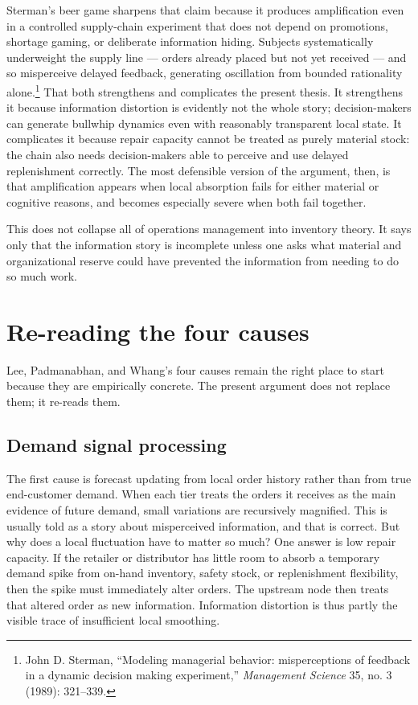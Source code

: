 \documentclass[11pt]{article}
\begin{document}
Sterman's beer game sharpens that claim because it produces amplification even in a controlled supply-chain experiment that does not depend on promotions, shortage gaming, or deliberate information hiding. Subjects systematically underweight the supply line --- orders already placed but not yet received --- and so misperceive delayed feedback, generating oscillation from bounded rationality alone.\footnote{John D. Sterman, ``Modeling managerial behavior: misperceptions of feedback in a dynamic decision making experiment,'' \emph{Management Science} 35, no. 3 (1989): 321--339.} That both strengthens and complicates the present thesis. It strengthens it because information distortion is evidently not the whole story; decision-makers can generate bullwhip dynamics even with reasonably transparent local state. It complicates it because repair capacity cannot be treated as purely material stock: the chain also needs decision-makers able to perceive and use delayed replenishment correctly. The most defensible version of the argument, then, is that amplification appears when local absorption fails for either material or cognitive reasons, and becomes especially severe when both fail together.

This does not collapse all of operations management into inventory theory. It says only that the information story is incomplete unless one asks what material and organizational reserve could have prevented the information from needing to do so much work.

\section{Re-reading the four causes}
Lee, Padmanabhan, and Whang's four causes remain the right place to start because they are empirically concrete. The present argument does not replace them; it re-reads them.

\subsection*{Demand signal processing}
The first cause is forecast updating from local order history rather than from true end-customer demand. When each tier treats the orders it receives as the main evidence of future demand, small variations are recursively magnified. This is usually told as a story about misperceived information, and that is correct. But why does a local fluctuation have to matter so much? One answer is low repair capacity. If the retailer or distributor has little room to absorb a temporary demand spike from on-hand inventory, safety stock, or replenishment flexibility, then the spike must immediately alter orders. The upstream node then treats that altered order as new information. Information distortion is thus partly the visible trace of insufficient local smoothing.
\end{document}
